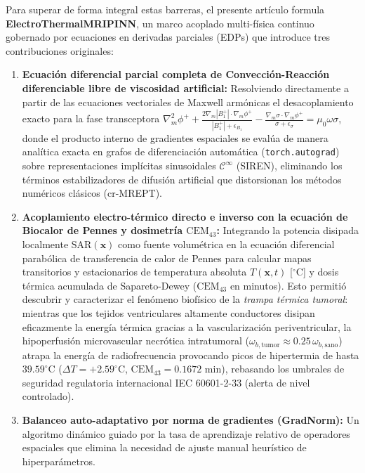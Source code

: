 \documentclass[11pt,a4paper]{article}
\begin{document}
Para superar de forma integral estas barreras, el presente artículo formula \textbf{ElectroThermalMRIPINN}, un marco acoplado multi-física continuo gobernado por ecuaciones en derivadas parciales (EDPs) que introduce tres contribuciones originales:
\begin{enumerate}
    \item \textbf{Ecuación diferencial parcial completa de Convección-Reacción diferenciable libre de viscosidad artificial:} Resolviendo directamente a partir de las ecuaciones vectoriales de Maxwell armónicas el desacoplamiento exacto para la fase transceptora $\nabla_m^2\phi^+ + \frac{2\nabla_m|B_1^+|\cdot\nabla_m\phi^+}{|B_1^+|+\epsilon_{B_1}} - \frac{\nabla_m\sigma\cdot\nabla_m\phi^+}{\sigma+\epsilon_\sigma} = \mu_0\omega\sigma$, donde el producto interno de gradientes espaciales se evalúa de manera analítica exacta en grafos de diferenciación automática (\texttt{torch.autograd}) sobre representaciones implícitas sinusoidales $\mathcal{C}^\infty$ (SIREN), eliminando los términos estabilizadores de difusión artificial que distorsionan los métodos numéricos clásicos (cr-MREPT).
    \item \textbf{Acoplamiento electro-térmico directo e inverso con la ecuación de Biocalor de Pennes y dosimetría $\text{CEM}_{43}$:} Integrando la potencia disipada localmente $\text{SAR}(\mathbf{x})$ como fuente volumétrica en la ecuación diferencial parabólica de transferencia de calor de Pennes para calcular mapas transitorios y estacionarios de temperatura absoluta $T(\mathbf{x}, t)$ [$^\circ\text{C}$] y dosis térmica acumulada de Sapareto-Dewey ($\text{CEM}_{43}$ en minutos). Esto permitió descubrir y caracterizar el fenómeno biofísico de la \textit{trampa térmica tumoral}: mientras que los tejidos ventriculares altamente conductores disipan eficazmente la energía térmica gracias a la vascularización periventricular, la hipoperfusión microvascular necrótica intratumoral ($\omega_{b,\text{tumor}} \approx 0.25\,\omega_{b,\text{sano}}$) atrapa la energía de radiofrecuencia provocando picos de hipertermia de hasta $39.59^\circ\text{C}$ ($\Delta T = +2.59^\circ\text{C}$, $\text{CEM}_{43} = 0.1672\text{ min}$), rebasando los umbrales de seguridad regulatoria internacional IEC 60601-2-33 (alerta de nivel controlado).
    \item \textbf{Balanceo auto-adaptativo por norma de gradientes (GradNorm):} Un algoritmo dinámico guiado por la tasa de aprendizaje relativo de operadores espaciales que elimina la necesidad de ajuste manual heurístico de hiperparámetros.
\end{enumerate}
\end{document}
